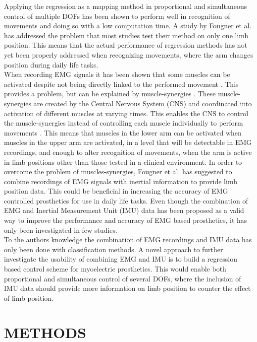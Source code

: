\begin{multicols}{2}
Applying the regression as a mapping method in proportional and simultaneous control of multiple DOFs has been shown to perform well in recognition of movements and doing so with a low computation time. \cite{hahne2014} A study by Fougner et al. \cite{Fougner2011} has addressed the problem that most studies test their method on only one limb position. This means that the actual performance of regression methods has not yet been properly addressed when recognizing movements, where the arm changes position during daily life tasks. \\
When recording EMG signals it has been shown that some muscles can be activated despite not being directly linked to the performed movement \cite{Fougner2011}. This provides a problem, but can be explained by muscle-synergies \cite{DeRugy2013}. These muscle-synergies are created by the Central Nervous System (CNS) and coordinated into activation of different muscles at varying times. This enables the CNS to control the muscle-synergies instead of controlling each muscle individually to perform movements \cite{jiang2009}. This means that muscles in the lower arm can be activated when muscles in the upper arm are activated, in a level that will be detectable in EMG recordings, and enough to alter recognition of movements, when the arm is active in limb positions other than those tested in a clinical environment. 
In order to overcome the problem of muscles-synergies, Fougner et al. \cite{Fougner2011} has suggested to combine recordings of EMG signals with inertial information to provide limb position data. This could be beneficial in increasing the accuracy of EMG controlled prosthetics for use in daily life tasks. 
Even though the combination of EMG and Inertial Measurement Unit (IMU) data has been proposed as a valid way to improve the performance and accuracy of EMG based prosthetics, it has only been investigated in few studies. \cite{Roy2010, Imtiaz2014, jiang2012} \\
To the authors knowledge the combination of EMG recordings and IMU data has only been done with classification methods. A novel approach to further investigate the usability of combining EMG and IMU is to build a regression based control scheme for myoelectric prosthetics. This would enable both proportional and simultaneous control of several DOFs, where the inclusion of IMU data should provide more information on limb position to counter the effect of limb position.		
	
\section*{METHODS}%
	

\end{multicols}
